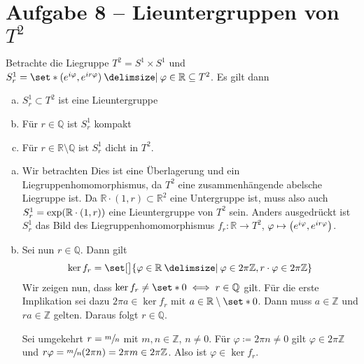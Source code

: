 \section{Aufgabe 8 -- Lieuntergruppen von $T^2$} %
\label{sec:aufg8}
Betrachte die Liegruppe $T^2= S^1 \times S^1$ und $S^1_r = \set*{(e^{i \varphi}, e^{i r \varphi}) \given \varphi \in \mathbb{R}} \subseteq T^2$.
Es gilt dann
\begin{enumerate}[a)]
	\item $S^1_r \subset T^2$ ist eine Lieuntergruppe
	\item Für $r \in \mathbb{Q}$ ist $S^1_r$ kompakt
	\item Für $r \in \mathbb{R} \setminus \mathbb{Q}$ ist $S^1_r$ dicht in $T^2$.
\end{enumerate}
\begin{beweis}
	\begin{enumerate}[a)]
		\item Wir betrachten 
		Dies ist eine Überlagerung und ein Liegruppenhomomorphismus, da $T^2$ eine zusammenhängende abelsche Liegruppe ist.
		Da $\mathbb{R} \cdot (1,r) \subset \mathbb{R}^2$ eine Untergruppe ist, muss also auch $S^1_r = \exp \enbrace*{\mathbb{R} \cdot (1,r)}$ eine Lieuntergruppe von $T^2$ sein.
		Anders ausgedrückt ist $S^1_r$ das Bild des Liegruppenhomomorphismus $f_r \colon \mathbb{R}\to T^2$, $\varphi \mapsto \enbrace*{e^{i \varphi}, e^{ir \varphi}}$.
		\item Sei nun $r \in \mathbb{Q}$.
		Dann gilt
		\[
			\ker f_r = \set[\big]{\varphi \in \mathbb{R} \given \varphi \in 2 \pi \mathbb{Z}, r \cdot \varphi \in 2 \pi \mathbb{Z}}
		\]
		Wir zeigen nun, dass $\ker f_r \neq \set*{0} \iff r \in \mathbb{Q}$ gilt.
		Für die erste Implikation sei dazu $2 \pi a \in \ker f_r$ mit $a \in \mathbb{R}\setminus \set*{0}$.
		Dann muss $a \in \mathbb{Z}$ und $ra \in \mathbb{Z}$ gelten.
		Daraus folgt $r \in \mathbb{Q}$.
		
		Sei umgekehrt $r= \sfrac{m}{n}$ mit $m,n \in \mathbb{Z}$, $n \neq 0$.
		Für $\varphi \coloneqq 2 \pi n \neq 0$ gilt $\varphi \in 2 \pi \mathbb{Z}$ und $r \varphi = \sfrac{m}{n}(2 \pi n) = 2 \pi m \in 2 \pi \mathbb{Z}$.
		Also ist $\varphi \in  \ker f_r$.
		

\end{enumerate}
\end{beweis}
